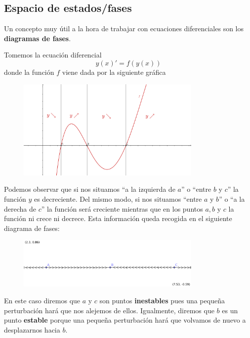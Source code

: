\subsection{Espacio de estados/fases}

Un concepto muy útil a la hora de trabajar con ecuaciones diferenciales son los \textbf{diagramas de fases}.

Tomemos la ecuación diferencial
\[y(x)'=f(y(x))\]
donde la función $f$ viene dada por la siguiente gráfica

\begin{figure}[hbtp]
\centering
\includegraphics[width = 0.8\textwidth]{img/propiedades-autonomas.png}
\end{figure}

Podemos observar que si nos situamos ``a la izquierda de $a$'' o ``entre $b$ y $c$'' la función $y$ es decreciente. Del mismo modo, si nos situamos ``entre $a$ y $b$'' o ``a la derecha de $c$'' la función será creciente mientras que en los puntos $a, b$ y $c$ la función ni crece ni decrece. Esta información queda recogida en el siguiente diagrama de fases:

\begin{figure}[hbtp]
\centering
\includegraphics[width = 0.8\textwidth]{img/diagrama-fases.png}
\end{figure}

En este caso diremos que $a$ y $c$ son puntos \textbf{inestables} pues una pequeña perturbación hará que nos alejemos de ellos. Igualmente, diremos que $b$ es un punto \textbf{estable} porque una pequeña perturbación hará que volvamos de nuevo a desplazarnos hacia $b$.

